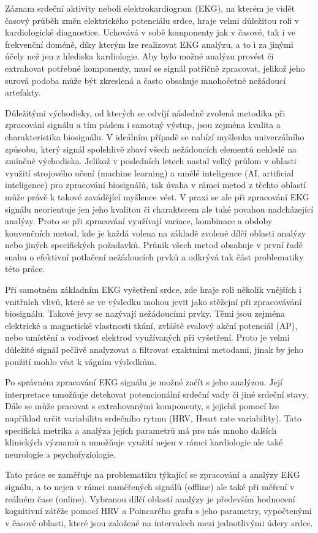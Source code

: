 Záznam srdeční aktivity neboli elektrokardiogram (EKG), na kterém je vidět
časový průběh změn elektrického potenciálu srdce, hraje velmi důležitou roli v
kardiologické diagnostice. Uchovává v sobě komponenty jak v časové, tak i ve
frekvenční doméně, díky kterým lze realizovat EKG analýzu, a to i za jinými
účely než jen z hlediska kardiologie. Aby bylo možné analýzu provést či
extrahovat potřebné komponenty, musí se signál patřičně zpracovat, jelikož jeho
surová podoba může být zkreslená a často obsahuje mnohočetné nežádoucí
artefakty.

Důležitými východisky, od kterých se odvíjí následně zvolená metodika při
zpracování signálu a tím pádem i samotný výstup, jsou zejména kvalita a
charakteristika biosignálu. V ideálním případě se nabízí myšlenka univerzálního
způsobu, který signál spolehlivě zbaví všech nežádoucích elementů nehledě na
zmíněné východiska. Jelikož v posledních letech nastal velký průlom v oblasti
využití strojového učení (machine learning) a umělé inteligence (AI, artificial
inteligence) pro zpracování biosignálů, tak úvaha v rámci metod z těchto oblastí
může právě k takové zavádějící myšlence vést. V praxi se ale při zpracování EKG
signálu neorientuje jen jeho kvalitou či charakterem ale také povahou
nadcházející analýzy. Proto se při zpracování využívají variace, kombinace a
obdoby konvenčních metod, kde je každá volena na základě zvolené dílčí oblasti
analýzy nebo jiných specifických požadavků. Průnik všech metod obsahuje v první
řadě snahu o efektivní potlačení nežádoucích prvků a odkrývá tak část
problematiky této práce.

Při samotném základním EKG vyšetření srdce, zde hraje roli několik vnějších i
vnitřních vlivů, které se ve výsledku mohou jevit jako stěžejní při zpracovávání
biosignálu. Takové jevy se nazývají nežádoucími prvky. Těmi jsou zejména
elektrické a magnetické vlastnosti tkání, zvláště svalový akční potenciál (AP),
nebo umístění a vodivost elektrod využívaných při vyšetření. Proto je velmi
důležité signál pečlivě analyzovat a filtrovat exaktními metodami, jinak by jeho
použití mohlo vést k vágním výsledkům. 

Po správném zpracování EKG signálu je možné začít s jeho analýzou. Její
interpretace umožňuje detekovat potencionální srdeční vady či jiné srdeční
stavy. Dále se může pracovat s extrahovanými komponenty, s jejichž pomocí lze
například určit variabilitu srdečního rytmu (HRV, Heart rate variability). Tato
specifická metrika a analýza jejích parametrů má pro nás mnoho dalších
klinických významů a umožňuje využití nejen v rámci kardiologie ale také
neurologie a psychofyziologie.

Tato práce se zaměřuje na problematiku týkající se zpracování a analýzy EKG
signálu, a to nejen v rámci naměřených signálů (offline) ale také při měření v
reálném čase (online). Vybranou dílčí oblastí analýzy je především hodnocení
kognitivní zátěže pomocí HRV a Poincarého grafu s jeho parametry, vypočtenými v
časové oblasti, které jsou založené na intervalech mezi jednotlivými údery
srdce.
